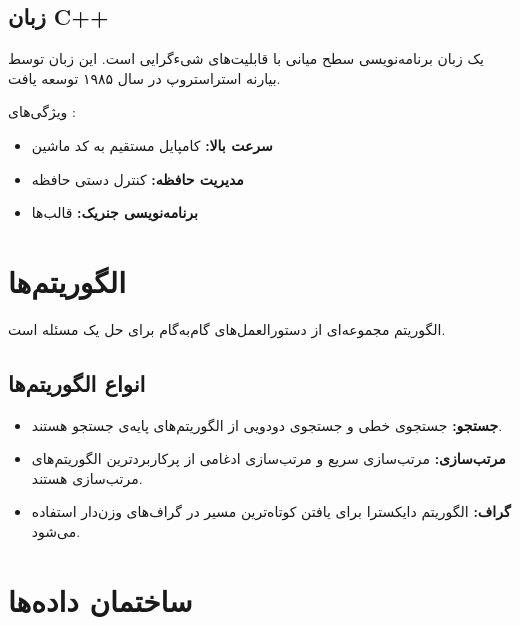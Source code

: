 \documentclass{matinbook}
\begin{document}
\subsection{زبان C++}
\label{sec:programming-cpp}

 یک زبان برنامه‌نویسی سطح میانی
با قابلیت‌های شیءگرایی است. این زبان
توسط بیارنه استراستروپ در
سال ۱۹۸۵ توسعه یافت.

ویژگی‌های :

\begin{itemize}
    \item \textbf{سرعت بالا:} کامپایل مستقیم به کد
    ماشین
    \item \textbf{مدیریت حافظه:} کنترل دستی حافظه
    \item \textbf{برنامه‌نویسی جنریک:} قالب‌ها
\end{itemize}

\section{الگوریتم‌ها}
\label{sec:programming-algorithms}

الگوریتم مجموعه‌ای از دستورالعمل‌های
گام‌به‌گام برای حل یک مسئله است.

\subsection{انواع الگوریتم‌ها}
\label{sec:programming-algorithms-types}

\begin{itemize}
    \item \textbf{جستجو:} جستجوی خطی
    و جستجوی دودویی از
    الگوریتم‌های پایه‌ی جستجو هستند.

    \item \textbf{مرتب‌سازی:} مرتب‌سازی سریع
    و مرتب‌سازی ادغامی
    از پرکاربردترین الگوریتم‌های مرتب‌سازی هستند.

    \item \textbf{گراف:} الگوریتم دایکسترا
    برای یافتن کوتاه‌ترین مسیر
    در گراف‌های وزن‌دار استفاده
    می‌شود.
\end{itemize}

\section{ساختمان داده‌ها}
\label{sec:programming-datastructures}
\end{document}
